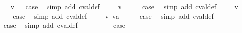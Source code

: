 \begin{isabellebody}
\ \ \isamarkupfalse%
\ {\isacharparenleft}{\isachardoublequoteopen}{}{\isacharunderscore}{}{\isachardoublequoteclose}\ v{\isacharparenright}\isanewline
{}\isamarkupfalse%
\ \isamarkupfalse%
\ {\isacharquery}case\ \isamarkupfalse%
\ {\isacharparenleft}simp\ add{\isacharcolon}\ cval{\isacharunderscore}def{\isacharparenright}\isanewline
{}\isamarkupfalse%
\isanewline
\ \ \isamarkupfalse%
\ {\isacharparenleft}{\isachardoublequoteopen}{}{\isacharunderscore}{}{\isachardoublequoteclose}\ v{\isacharparenright}\isanewline
\ \ \isamarkupfalse%
\ \isamarkupfalse%
\ {\isacharquery}case\ \isamarkupfalse%
\ {\isacharparenleft}simp\ add{\isacharcolon}\ cval{\isacharunderscore}def{\isacharparenright}\isanewline
{}\isamarkupfalse%
\isanewline
\ \ \isamarkupfalse%
\ {\isacharparenleft}{\isachardoublequoteopen}{}{\isacharunderscore}{}{\isachardoublequoteclose}\ v{\isacharparenright}\isanewline
\ \ \isamarkupfalse%
\ \isamarkupfalse%
\ {\isacharquery}case\ \isamarkupfalse%
\ {\isacharparenleft}simp\ add{\isacharcolon}\ cval{\isacharunderscore}def{\isacharparenright}\isanewline
{}\isamarkupfalse%
\isanewline
\ \ \isamarkupfalse%
\ {\isacharparenleft}{\isachardoublequoteopen}{}{\isacharunderscore}{}{\isachardoublequoteclose}\ v\ va{\isacharparenright}\isanewline
\ \ \isamarkupfalse%
\ \isamarkupfalse%
\ {\isacharquery}case\ \isamarkupfalse%
\ {\isacharparenleft}simp\ add{\isacharcolon}\ cval{\isacharunderscore}def{\isacharparenright}\isanewline
{}\isamarkupfalse%
\isanewline
\ \ \isamarkupfalse%
\ {\isachardoublequoteopen}{}{\isacharunderscore}{}{\isachardoublequoteclose}\isanewline
\ \ \isamarkupfalse%
\ \isamarkupfalse%
\ {\isacharquery}case\ \isamarkupfalse%
\ {\isacharparenleft}simp\ add{\isacharcolon}\ cval{\isacharunderscore}def{\isacharparenright}\isanewline
{}\isamarkupfalse%
\isanewline
\ \ \isamarkupfalse%
\ {\isachardoublequoteopen}{}{\isacharunderscore}{}{\isachardoublequoteclose}\isanewline
\ \ \isamarkupfalse%
\ \isamarkupfalse%
\ {\isacharquery}case\isanewline
\ \ \ \ \isamarkupfalse%

\end{isabellebody}
